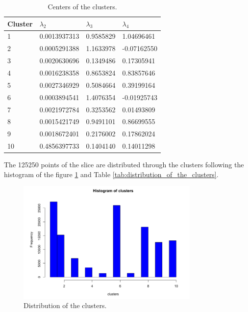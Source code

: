 \begin{table}
\begin{center}
    \begin{tabular}{|l|l|l|l|}
    \hline
    \textbf{Cluster} & $\lambda_{2}$ & $\lambda_{3}$ & $\lambda_{4}$         \\ \hline
    1     & 0.0013937313 & 0.9585829 & 1.04696461              \\ \hline
    2     & 0.0005291388 & 1.1633978 & -0.07162550            \\ \hline
    3     & 0.0020630696 & 0.1349486 & 0.17305941            \\ \hline
    4     &  0.0016238358 & 0.8653824 & 0.83857646               \\ \hline
    5     & 0.0027346929 & 0.5084664 & 0.39199164                \\ \hline
    6     & 0.0003894541 & 1.4076354 & -0.01925743               \\ \hline
    7     & 0.0021972784 & 0.3253562 & 0.01493809                 \\ \hline
    8     & 0.0015421749 & 0.9491101 & 0.86699555                \\ \hline
    9     & 0.0018672401 & 0.2176002 & 0.17862024            \\ \hline
    10   & 0.4856397733 & 0.1404140 & 0.14011298             \\ \hline
    \end{tabular}
    \caption {Centers of the clusters.}
    \label{tab:center_of_the_clusters}
    \end{center}
\end{table}

The 125250 points of the slice are distributed through the clusters following the histogram of the figure \ref{fig:Clusters_histogram} and Table \ref{tab:distribution_of_the_clusters}. 

\begin{figure}[H]
    \centering
    \includegraphics[width=0.8\textwidth]{images/Clusters_histogram.png}
    \caption{Distribution of the clusters.}
    \label{fig:Clusters_histogram}
\end{figure}

